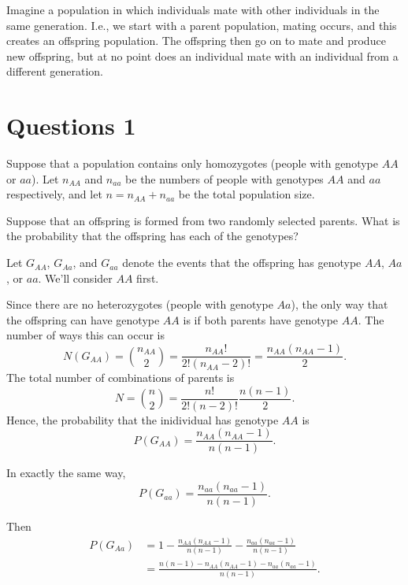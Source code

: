 \documentclass[addpoints,answers]{exam}
\begin{document}
Imagine a population in which individuals mate with other individuals in the same generation. I.e., we start with a parent population, mating occurs, and this creates an offspring population. The offspring then go on to mate and produce new offspring, but at no point does an individual mate with an individual from a different generation. 

\newpage

\section*{Questions 1}

\begin{questions}

\question
   Suppose that a population contains only homozygotes (people with genotype $AA$ or $aa$). Let $n_{AA}$ and $n_{aa}$ be the numbers of people with genotypes $AA$ and $aa$ respectively, and let $n=n_{AA}+n_{aa}$ be the total population size. 
   
  \medskip
  
  Suppose that an offspring is formed from two randomly selected parents. What is the probability that the offspring has each of the genotypes?
  
  \begin{solution}
  Let $G_{AA}$, $G_{Aa}$, and $G_{aa}$ denote the events that the offspring has genotype $AA$, $Aa$, or $aa$. We'll consider $AA$ first.
  
  Since there are no heterozygotes (people with genotype $Aa$), the only way that the offspring can have genotype $AA$ is if both parents have genotype $AA$. The number of ways this can occur is
  $$
  N(G_{AA})={n_{AA} \choose 2}=\frac{n_{AA}!}{2!(n_{AA}-2)!}=\frac{n_{AA}(n_{AA}-1)}{2}.
  $$
  The total number of combinations of parents is
  $$
  N={n \choose 2}=\frac{n!}{2!(n-2)!}\frac{n(n-1)}{2}.
  $$
  Hence, the probability that the inidividual has genotype $AA$ is
  $$
  P(G_{AA})=\frac{n_{AA}(n_{AA}-1)}{n(n-1)}.
  $$
  
  In exactly the same way, 
  $$
  P(G_{aa})=\frac{n_{aa}(n_{aa}-1)}{n(n-1)}.
  $$
  
  Then 
  $$
  \begin{aligned}
  P(G_{Aa})&=1-\frac{n_{AA}(n_{AA}-1)}{n(n-1)}-\frac{n_{aa}(n_{aa}-1)}{n(n-1)}\\
  &=\frac{n(n-1)-n_{AA}(n_{AA}-1)-n_{aa}(n_{aa}-1)}{n(n-1)}.
  \end{aligned}
  $$
  \end{solution}


\end{questions}
\end{document}
